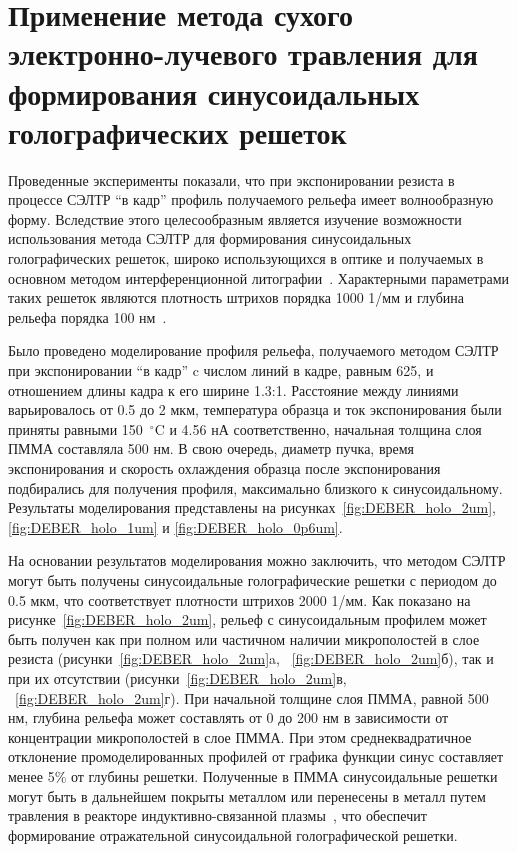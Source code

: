 \section{Применение метода сухого электронно-лучевого травления для формирования синусоидальных голографических решеток}

Проведенные эксперименты показали, что при экспонировании резиста в процессе СЭЛТР ``в кадр'' профиль получаемого рельефа имеет волнообразную форму.
Вследствие этого целесообразным является изучение возможности использования метода СЭЛТР для формирования синусоидальных голографических решеток, широко использующихся в оптике и получаемых в основном методом интерференционной литографии~\cite{Harrison2004_sin_gratings, Tishchenko2017_sin_gratings}.
Характерными параметрами таких решеток являются плотность штрихов порядка 1000 1/мм и глубина рельефа порядка 100 нм~\cite{Harvey2020_diffraction_gratings}.

Было проведено моделирование профиля рельефа, получаемого методом СЭЛТР при экспонировании ``в кадр'' c числом линий в кадре, равным 625, и отношением длины кадра к его ширине 1.3:1.
Расстояние между линиями варьировалось от 0.5 до 2 мкм, температура образца и ток экспонирования были приняты равными 150~$^\circ$C и 4.56 нА соответственно, начальная толщина слоя ПММА составляла 500 нм.
В свою очередь, диаметр пучка, время экспонирования и скорость охлаждения образца после экспонирования подбирались для получения профиля, максимально близкого к синусоидальному.
Результаты моделирования представлены на рисунках~\ref{fig:DEBER_holo_2um}, \ref{fig:DEBER_holo_1um} и \ref{fig:DEBER_holo_0p6um}.

На основании результатов моделирования можно заключить, что методом СЭЛТР могут быть получены синусоидальные голографические решетки с периодом до 0.5 мкм, что соответствует плотности штрихов 2000 1/мм.
Как показано на рисунке~\ref{fig:DEBER_holo_2um}, рельеф с синусоидальным профилем может быть получен как при полном или частичном наличии микрополостей в слое резиста (рисунки~\ref{fig:DEBER_holo_2um}a, ~\ref{fig:DEBER_holo_2um}б), так и при их отсутствии (рисунки~\ref{fig:DEBER_holo_2um}в, ~\ref{fig:DEBER_holo_2um}г).
При начальной толщине слоя ПММА, равной 500 нм, глубина рельефа может составлять от 0 до 200 нм в зависимости от концентрации микрополостей в слое ПММА.
При этом среднеквадратичное отклонение промоделированных профилей от графика функции синус составляет менее 5\% от глубины решетки.
Полученные в \linebreak ПММА синусоидальные решетки могут быть в дальнейшем покрыты металлом или перенесены в металл путем травления в реакторе индуктивно-связанной плазмы~\cite{Bruk_2016_mee}, что обеспечит формирование отражательной синусоидальной голографической решетки.

